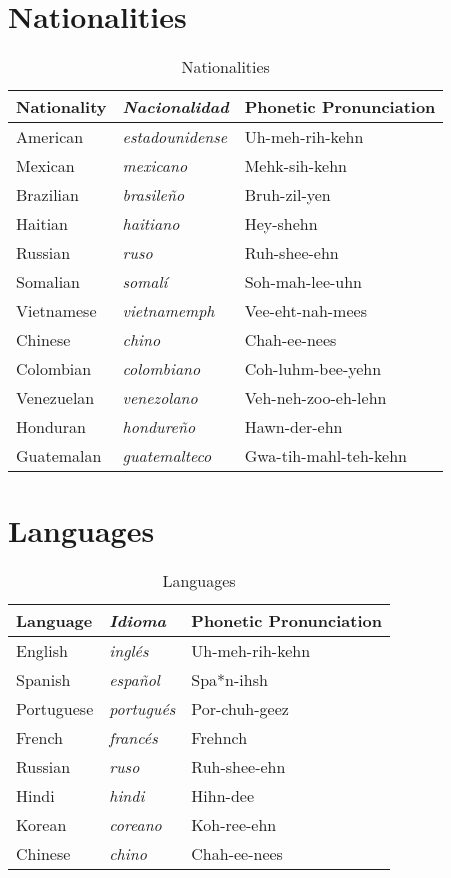 \section{Nationalities}
\begin{table}[H]
	\center
	\begin{tabular}{lll}
	\toprule
	\textbf{Nationality} & \textbf{\emph{Nacionalidad}} & \textbf{Phonetic Pronunciation} \\
	\midrule
	American & \emph{estadounidense} & Uh-meh-rih-kehn \\
	Mexican & \emph{mexicano} & Mehk-sih-kehn \\
	Brazilian & \emph{brasile\~no} & Bruh-zil-yen \\
	Haitian & \emph{haitiano} & Hey-shehn \\
	Russian & \emph{ruso} & Ruh-shee-ehn \\
	Somalian & \emph{somalí} & Soh-mah-lee-uhn \\
	Vietnamese & \emph{vietnamemph} & Vee-eht-nah-mees \\
	Chinese & \emph{chino} & Chah-ee-nees\\
	Colombian & \emph{colombiano} & Coh-luhm-bee-yehn \\
	Venezuelan & \emph{venezolano} & Veh-neh-zoo-eh-lehn \\
	Honduran & \emph{hondure\~no} & Hawn-der-ehn \\
	Guatemalan & \emph{guatemalteco} & Gwa-tih-mahl-teh-kehn \\
	\bottomrule
	\end{tabular}
	\caption{Nationalities}
\end{table}

\section{Languages}
\begin{table}[H]
	\center
	\begin{tabular}{lll}
	\toprule
	\textbf{Language} & \textbf{\emph{Idioma}} & \textbf{Phonetic Pronunciation} \\
	\midrule
	English & \emph{ingl\'es} & Uh-meh-rih-kehn \\
	Spanish & \emph{espa\~nol} & Spa*n-ihsh \\
	Portuguese & \emph{portugués} & Por-chuh-geez \\
	French & \emph{francés} & Frehnch \\
	Russian & \emph{ruso} & Ruh-shee-ehn \\
	Hindi & \emph{hindi} & Hihn-dee \\
	Korean & \emph{coreano} & Koh-ree-ehn \\
	Chinese & \emph{chino} & Chah-ee-nees\\
	\bottomrule
	\end{tabular}
	\caption{Languages}
\end{table}


